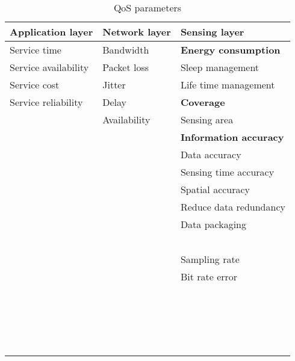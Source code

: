 \begin{table}[h!]
	\begin{tabulary}{\textwidth}{L|L|L}
	\textbf{Application layer} & \textbf{Network layer} & \textbf{Sensing layer }        \\\hline
	Service time               & Bandwidth              & \textbf{Energy consumption}                  \\
	Service availability       & Packet loss            & Sleep management          \\
	Service cost               & Jitter                 & Life time management                  \\
	Service reliability        & Delay                  & \textbf{Coverage}                   \\
	\                          & Availability           & Sensing area              \\
	\                          &                        & \textbf{Information accuracy}  \\
	\                          &                        & Data accuracy                  \\
	\                          &                        & Sensing time accuracy          \\
	\                          &                        & Spatial accuracy               \\
	\                          &                        & Reduce data redundancy         \\
	\                          &                        & Data packaging                 \\
	\                          &                        &                                \\\hline
	\                          &                        & Sampling rate                               \\\hline
	\                          &                        & Bit rate error                               \\\hline
	\                          &                        &                                \\\hline
	\                          &                        &                                \\\hline
	\                          &                        &                                \\\hline
	\                          &                        &                                \\\hline

	\end{tabulary}
\caption{\label{tab:} QoS parameters \cite{meshinchi_qosaware_2018} \cite{chowdhury_survey_2018}}
\end{table}










